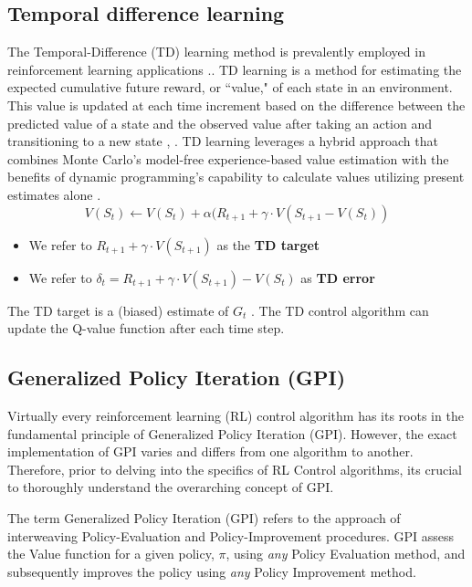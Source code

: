 \subsection{Temporal difference learning}

The Temporal-Difference (TD) learning method is prevalently employed in reinforcement learning applications \cite{RL3}.. TD learning is a method for estimating the expected cumulative future reward, or ``value," of each state in an environment. This value is updated at each time increment based on the difference between the predicted value of a state and the observed value after taking an action and transitioning to a new state \cite{RL}, \cite{RL2}.
TD learning leverages a hybrid approach that combines Monte Carlo's model-free experience-based value estimation with the benefits of dynamic programming's capability to calculate values utilizing present estimates alone \cite{sutton1988b}. 
\begin{equation}
    V(S_t) \leftarrow V(S_t) + \alpha(R_{t+1} + \gamma \cdot V(S_{t+1} - V(S_t))
\end{equation}
\begin{itemize}
    \item We refer to $R_{t+1} + \gamma \cdot V(S_{t+1})$ as the \textbf{TD target}
    \item We refer to $\delta_{t} = R_{t+1} + \gamma \cdot V(S_{t+1}) - V(S_{t})$ as  \textbf{TD error}
\end{itemize}
The TD target is a (biased) estimate of $G_t$ \cite{RL}. The TD control algorithm can update the Q-value function after each time step. 


\subsection{Generalized Policy Iteration (GPI)}
 Virtually every reinforcement learning (RL) control algorithm has its roots in the fundamental principle of Generalized Policy Iteration (GPI). 
 However, the exact implementation of GPI varies and differs from one algorithm to another. 
 Therefore, prior to delving into the specifics of RL Control algorithms, its crucial to thoroughly understand the overarching concept of GPI. 

The term Generalized Policy Iteration (GPI) refers to the approach of interweaving Policy-Evaluation and Policy-Improvement procedures. 
GPI assess the Value function for a given policy, $\pi$, using \textit{any} Policy Evaluation method, and subsequently improves the policy using \textit{any} Policy Improvement method.

